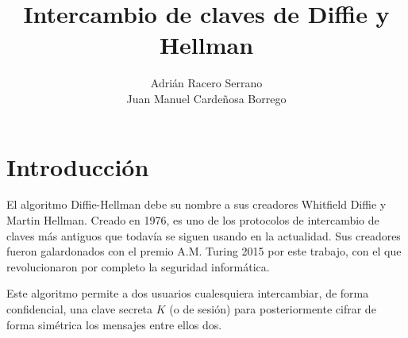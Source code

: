 \documentclass[11pt]{article}
\title{\textbf{\huge Intercambio de claves de Diffie y Hellman}}
\author{Adrián Racero Serrano\\Juan Manuel Cardeñosa Borrego}
\date{}
\begin{document}
\maketitle

\thispagestyle{empty}

\newpage

\setcounter{page}{1}
\tableofcontents

\newpage

\section{Introducción}
El algoritmo Diffie-Hellman debe su nombre a sus creadores Whitfield Diffie y Martin Hellman. Creado en 1976, es uno de los protocolos de intercambio de claves más antiguos que todavía se siguen usando en la actualidad. Sus creadores fueron galardonados con el premio A.M. Turing 2015 por este trabajo, con el que revolucionaron por completo la seguridad informática.

Este algoritmo permite a dos usuarios cualesquiera intercambiar, de forma confidencial, una clave secreta $K$ (o de sesión) para posteriormente cifrar de forma simétrica los mensajes entre ellos dos.
\end{document}
